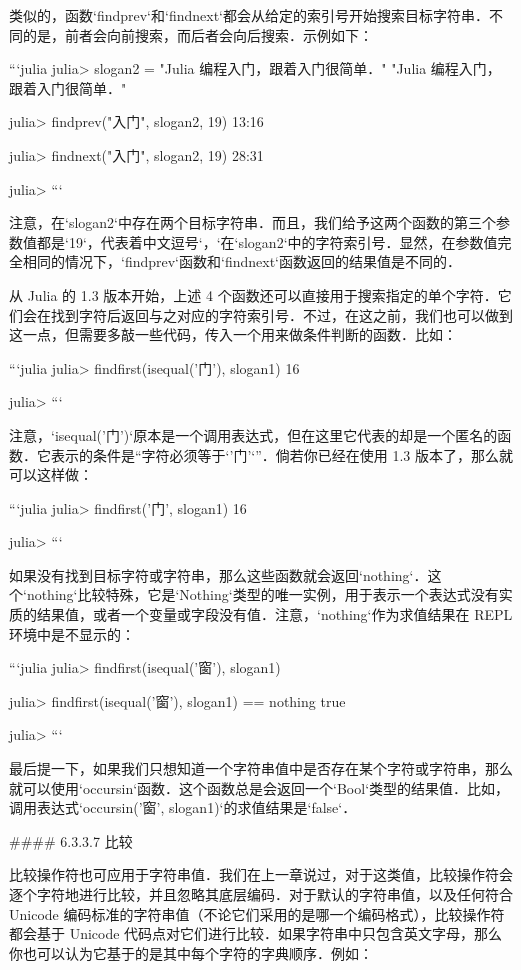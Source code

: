 类似的，函数`findprev`和`findnext`都会从给定的索引号开始搜索目标字符串．不同的是，前者会向前搜索，而后者会向后搜索．示例如下：

```julia
julia> slogan2 = "Julia 编程入门，跟着入门很简单．"
"Julia 编程入门，跟着入门很简单．"

julia> findprev("入门", slogan2, 19)
13:16

julia> findnext("入门", slogan2, 19)
28:31

julia> 
```

注意，在`slogan2`中存在两个目标字符串．而且，我们给予这两个函数的第三个参数值都是`19`，代表着中文逗号`，`在`slogan2`中的字符索引号．显然，在参数值完全相同的情况下，`findprev`函数和`findnext`函数返回的结果值是不同的．

从 Julia 的 1.3 版本开始，上述 4 个函数还可以直接用于搜索指定的单个字符．它们会在找到字符后返回与之对应的字符索引号．不过，在这之前，我们也可以做到这一点，但需要多敲一些代码，传入一个用来做条件判断的函数．比如：

```julia
julia> findfirst(isequal('门'),  slogan1) 
16

julia> 
```

注意，`isequal('门')`原本是一个调用表达式，但在这里它代表的却是一个匿名的函数．它表示的条件是“字符必须等于`'门'`”．倘若你已经在使用 1.3 版本了，那么就可以这样做：

```julia
julia> findfirst('门',  slogan1)
16

julia> 
```

如果没有找到目标字符或字符串，那么这些函数就会返回`nothing`．这个`nothing`比较特殊，它是`Nothing`类型的唯一实例，用于表示一个表达式没有实质的结果值，或者一个变量或字段没有值．注意，`nothing`作为求值结果在 REPL 环境中是不显示的：

```julia
julia> findfirst(isequal('窗'),  slogan1) 

julia> findfirst(isequal('窗'),  slogan1) == nothing
true

julia> 
```

最后提一下，如果我们只想知道一个字符串值中是否存在某个字符或字符串，那么就可以使用`occursin`函数．这个函数总是会返回一个`Bool`类型的结果值．比如，调用表达式`occursin('窗',  slogan1)`的求值结果是`false`．

#### 6.3.3.7 比较

比较操作符也可应用于字符串值．我们在上一章说过，对于这类值，比较操作符会逐个字符地进行比较，并且忽略其底层编码．对于默认的字符串值，以及任何符合 Unicode 编码标准的字符串值（不论它们采用的是哪一个编码格式），比较操作符都会基于 Unicode 代码点对它们进行比较．如果字符串中只包含英文字母，那么你也可以认为它基于的是其中每个字符的字典顺序．例如：

